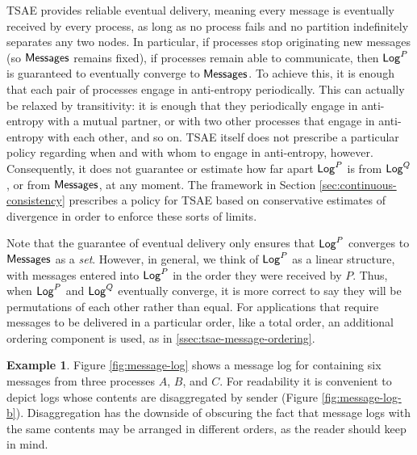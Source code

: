 \documentclass[]             %
{NASA}                       %
\theoremstyle{definition}
\newtheorem{example}[theorem]{Example}
\begin{document}
TSAE provides reliable eventual delivery, meaning every message is
eventually received by every process, as long as no process fails and
no partition indefinitely separates any two nodes. In particular, if
processes stop originating new messages (so $\mathbf{\mathsf{Messages}}$ remains fixed), if
processes remain able to communicate, then $\mathsf{Log}^{P}$ is guaranteed to
eventually converge to $\mathbf{\mathsf{Messages}}$. To achieve this, it is enough that each
pair of processes engage in anti-entropy periodically. This can
actually be relaxed by transitivity: it is enough that they
periodically engage in anti-entropy with a mutual partner, or with two
other processes that engage in anti-entropy with each other, and so
on. TSAE itself does not prescribe a particular policy regarding when
and with whom to engage in anti-entropy, however. Consequently, it
does not guarantee or estimate how far apart $\mathsf{Log}^{P}$ is from
$\mathsf{Log}^{Q}$, or from $\mathbf{\mathsf{Messages}}$, at any moment. The framework in Section
\ref{sec:continuous-consistency} prescribes a policy for TSAE based on
conservative estimates of divergence in order to enforce these sorts
of limits.

Note that the guarantee of eventual delivery only ensures that
$\mathsf{Log}^{P}$ converges to $\mathbf{\mathsf{Messages}}$ as a \emph{set}. However, in general, we
think of $\mathsf{Log}^{P}$ as a linear structure, with messages entered into
$\mathsf{Log}^{P}$ in the order they were received by $P$. Thus, when $\mathsf{Log}^{P}$
and $\mathsf{Log}^{Q}$ eventually converge, it is more correct to say they will
be permutations of each other rather than equal. For applications that
require messages to be delivered in a particular order, like a total
order, an additional ordering component is used, as in
\ref{ssec:tsae-message-ordering}.

\begin{example}
  Figure \ref{fig:message-log} shows a message log for containing six
  messages from three processes $A$, $B$, and $C$. For readability it
  is convenient to depict logs whose contents are disaggregated by
  sender (Figure \ref{fig:message-log-b}). Disaggregation has the
  downside of obscuring the fact that message logs with the same
  contents may be arranged in different orders, as the reader should
  keep in mind.
\end{example}
\end{document}
